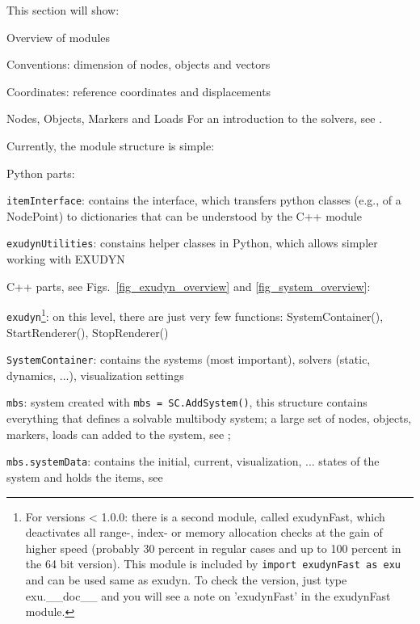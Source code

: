 
 \label{sec:programStructure}
This section will show:
\bi
  \item Overview of modules
  \item Conventions: dimension of nodes, objects and vectors
	\item Coordinates: reference coordinates and displacements
	\item Nodes, Objects, Markers and Loads
\ei
For an introduction to the solvers, see .

Currently, the module structure is simple:
\bi
  \item Python parts:
	\bi
	  \item \texttt{itemInterface}: contains the interface, which transfers python classes (e.g., of a NodePoint) to dictionaries that can be understood by the C++ module
	  \item \texttt{exudynUtilities}: constains helper classes in Python, which allows simpler working with EXUDYN
	\ei
  \item C++ parts, see Figs.\ \ref{fig_exudyn_overview} and \ref{fig_system_overview}:
	\bi
	  \item \texttt{exudyn}\footnote{For versions < 1.0.0: there is a second module, called exudynFast, which deactivates all range-, index- or memory allocation checks at the gain of higher speed (probably 30 percent in regular cases and up to 100 percent in the 64 bit version). This module is included by \texttt{import exudynFast as exu} and can be used same as exudyn. To check the version, just type exu.\_\_doc\_\_ and you will see a note on 'exudynFast' in the exudynFast module.}: on this level, there are just very few functions: SystemContainer(), StartRenderer(), StopRenderer()
	  \item \texttt{SystemContainer}: contains the systems (most important), solvers (static, dynamics, ...), visualization settings
	  \item \texttt{mbs}: system created with \texttt{mbs = SC.AddSystem()}, this structure contains everything that defines a solvable multibody system; a large set of nodes, objects, markers, 
		loads can added to the system, see ;
		\item \texttt{mbs.systemData}: contains the initial, current, visualization, ... states of the system and holds the items, see 
	\ei
\ei
%
